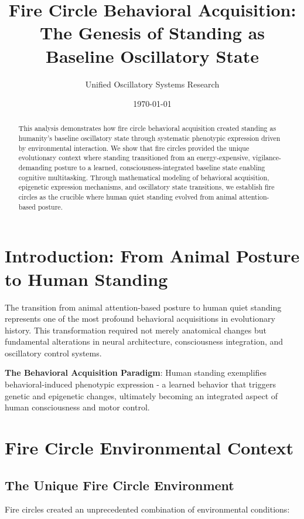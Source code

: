 \documentclass[12pt]{article}
\title{Fire Circle Behavioral Acquisition: The Genesis of Standing as Baseline Oscillatory State}
\author{Unified Oscillatory Systems Research}
\date{\today}
\begin{document}
\maketitle

\begin{abstract}
This analysis demonstrates how fire circle behavioral acquisition created standing as humanity's baseline oscillatory state through systematic phenotypic expression driven by environmental interaction. We show that fire circles provided the unique evolutionary context where standing transitioned from an energy-expensive, vigilance-demanding posture to a learned, consciousness-integrated baseline state enabling cognitive multitasking. Through mathematical modeling of behavioral acquisition, epigenetic expression mechanisms, and oscillatory state transitions, we establish fire circles as the crucible where human quiet standing evolved from animal attention-based posture.
\end{abstract}

\section{Introduction: From Animal Posture to Human Standing}

The transition from animal attention-based posture to human quiet standing represents one of the most profound behavioral acquisitions in evolutionary history. This transformation required not merely anatomical changes but fundamental alterations in neural architecture, consciousness integration, and oscillatory control systems.

\textbf{The Behavioral Acquisition Paradigm}: Human standing exemplifies behavioral-induced phenotypic expression - a learned behavior that triggers genetic and epigenetic changes, ultimately becoming an integrated aspect of human consciousness and motor control.

\section{Fire Circle Environmental Context}

\subsection{The Unique Fire Circle Environment}

Fire circles created an unprecedented combination of environmental conditions:
\end{document}
